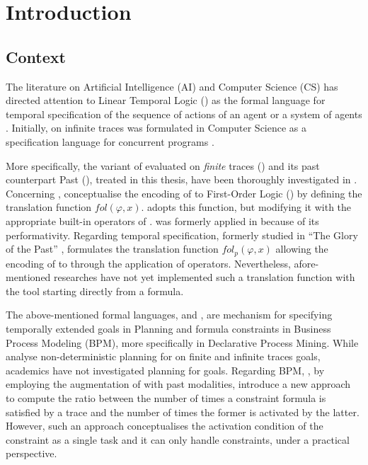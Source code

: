 \chapter{Introduction}
\section{Context}
The literature on Artificial Intelligence (AI) and Computer Science (CS) has directed attention to Linear Temporal Logic (\LTL) as the formal language for temporal specification of the sequence of actions of an agent or a system of agents \citep{fagin2004reasoning}. Initially, \LTL on infinite traces was formulated in Computer Science as a specification language for concurrent programs \citep{Pnueli:1977:TLP:1382431.1382534}.

More specifically, the variant of \LTL evaluated on \textit{finite} traces (\LTLf) and its past counterpart  Past \LTL (\PLTL), treated in this thesis, have been thoroughly investigated in \cite{de2013linear,lichtenstein1985glory}. Concerning \LTLf, \cite{de2013linear} conceptualise the encoding of \LTLf to First-Order Logic (\FOL) by defining the translation function $fol(\varphi, x)$. \cite{zpv2018} adopts this function, but modifying it with the appropriate built-in operators of \MONA. \MONA was formerly applied in \cite{zhu2017symbolic} because of its performativity. Regarding \PLTL temporal specification, formerly studied in ``The Glory of the Past'' \citep{lichtenstein1985glory}, \cite{zpv2018} formulates the translation function $fol_p(\varphi, x)$ allowing the encoding of \PLTL to \FOL through the application of \MONA operators. Nevertheless, afore-mentioned researches have not yet implemented such a translation function with the \MONA tool starting directly from a \PLTL formula. 

The above-mentioned formal languages, \LTLf and \PLTL, are mechanism for specifying temporally extended goals in Planning and formula constraints in Business Process Modeling (BPM), more specifically in Declarative Process Mining. While \cite{camacho2017non} analyse non-deterministic planning for \LTL on finite and infinite traces goals, academics have not investigated planning for \PLTL goals. Regarding BPM, \cite{cecconi2018interestingness}, by employing the augmentation of \LTLf with past modalities, introduce a new approach to compute the ratio between the number of times a constraint formula is satisfied by a trace and the number of times the former is activated by the latter. However, such an approach conceptualises the activation condition of the constraint as a single task and it can only handle \declare constraints, under a practical perspective.

